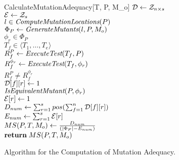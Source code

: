 \documentclass{article}
\def\widow#1{\vskip #1\vbadness10000\penalty-200\vskip-#1}
\begin{document}
\def\widow#1{\vskip #1\vbadness10000\penalty-200\vskip-#1}

\begin{figure}[t]
\begin{algorithm}{CalculateMutationAdequacy}[T, P, M_o]
{
}
${\cal D} \mathrel{\leftarrow} {\cal Z}_{n \times s}$ \\
${\cal E} \mathrel{\leftarrow} {\cal Z}_{s}$ \\
\qfor $l \in \mbox{\it ComputeMutationLocations}(P)$ \\
\qdo $\Phi_P \mathrel{\leftarrow} \mbox{\it GenerateMutants}(l,P,M_o)$ \\
\qfor $\phi_r \in \Phi_P$ \\
\qdo \qfor $T_f \in \langle T_1, \ldots, T_e \rangle$ \\
\qdo $R_f^P \mathrel{\leftarrow} \mbox{\it ExecuteTest}(T_f,P)$ \\
$R_f^{\phi_r} \mathrel{\leftarrow} \mbox{\it ExecuteTest}(T_f,\phi_r)$ \\
\qif $R_f^P \neq R_f^{\phi_r}$ \\
\qdo ${\cal D}[f][r] \mathrel{\leftarrow} 1$ \\
\qelse \qif ${\it \mbox{\it IsEquivalentMutant}}(P,\phi_r)$ 
                                                 \\ \label{equivalent}
\qdo ${\cal E}[r] \mathrel{\leftarrow} 1$ \qfi \qfi \qrof \qrof \qrof \\
$D_{num} \mathrel{\leftarrow} \sum_{r=1}^s pos( \sum_{f=1}^n {\cal D}[f][r] )$ \\ \label{sum1}
$E_{num} \mathrel{\leftarrow} \sum_{r=1}^s {\cal E}[r] $ \\ \label{sum2}
$MS(P,T,M_o) \mathrel{\leftarrow} \frac{D_{num}}{(|\Phi_P| - E_{num})}$ \\ \label{result}
$\textbf{return} \; MS(P,T,M_o)$
\end{algorithm}
\caption{Algorithm for the Computation of Mutation Adequacy.}
\label{fig:mutation_adequacy}
\end{figure}
\end{document}
